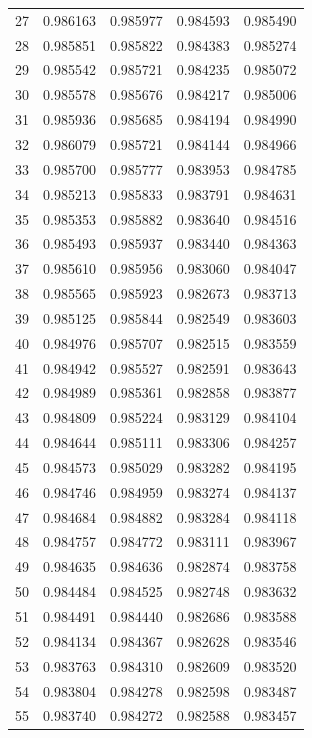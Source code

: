 \begin{table}
\begin{tabular}{rrrrr}
27 & 0.986163 & 0.985977 & 0.984593 & 0.985490 \\
28 & 0.985851 & 0.985822 & 0.984383 & 0.985274 \\
29 & 0.985542 & 0.985721 & 0.984235 & 0.985072 \\
30 & 0.985578 & 0.985676 & 0.984217 & 0.985006 \\
31 & 0.985936 & 0.985685 & 0.984194 & 0.984990 \\
32 & 0.986079 & 0.985721 & 0.984144 & 0.984966 \\
33 & 0.985700 & 0.985777 & 0.983953 & 0.984785 \\
34 & 0.985213 & 0.985833 & 0.983791 & 0.984631 \\
35 & 0.985353 & 0.985882 & 0.983640 & 0.984516 \\
36 & 0.985493 & 0.985937 & 0.983440 & 0.984363 \\
37 & 0.985610 & 0.985956 & 0.983060 & 0.984047 \\
38 & 0.985565 & 0.985923 & 0.982673 & 0.983713 \\
39 & 0.985125 & 0.985844 & 0.982549 & 0.983603 \\
40 & 0.984976 & 0.985707 & 0.982515 & 0.983559 \\
41 & 0.984942 & 0.985527 & 0.982591 & 0.983643 \\
42 & 0.984989 & 0.985361 & 0.982858 & 0.983877 \\
43 & 0.984809 & 0.985224 & 0.983129 & 0.984104 \\
44 & 0.984644 & 0.985111 & 0.983306 & 0.984257 \\
45 & 0.984573 & 0.985029 & 0.983282 & 0.984195 \\
46 & 0.984746 & 0.984959 & 0.983274 & 0.984137 \\
47 & 0.984684 & 0.984882 & 0.983284 & 0.984118 \\
48 & 0.984757 & 0.984772 & 0.983111 & 0.983967 \\
49 & 0.984635 & 0.984636 & 0.982874 & 0.983758 \\
50 & 0.984484 & 0.984525 & 0.982748 & 0.983632 \\
51 & 0.984491 & 0.984440 & 0.982686 & 0.983588 \\
52 & 0.984134 & 0.984367 & 0.982628 & 0.983546 \\
53 & 0.983763 & 0.984310 & 0.982609 & 0.983520 \\
54 & 0.983804 & 0.984278 & 0.982598 & 0.983487 \\
55 & 0.983740 & 0.984272 & 0.982588 & 0.983457 \\

\end{tabular}
\end{table}
